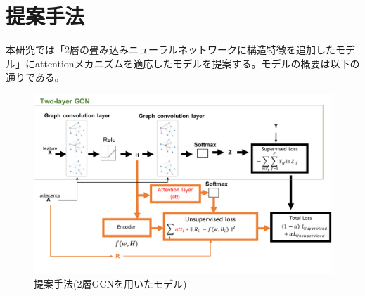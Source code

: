 \chapter{提案手法}


本研究では「2層の畳み込みニューラルネットワークに構造特徴を追加したモデル」にattentionメカニズムを適応したモデルを提案する。モデルの概要は以下の通りである。
\begin{figure}[htbp]
\includegraphics[width=1.0\hsize]{figures/proposed2.pdf}
\caption{提案手法(2層GCNを用いたモデル)}
\label{fig:architecture}
\end{figure}
\\
\\
